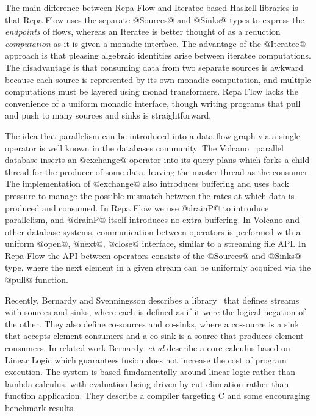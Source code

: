 The main difference between Repa Flow and Iteratee based Haskell libraries 
\cite{Kiselyov:iteratee, hackage:enumerator, hackage:conduit, hackage:pipes} is that Repa Flow uses the separate @Sources@ and @Sinks@ types to express the \emph{endpoints} of flows, whereas an Iteratee is better thought of as a reduction \emph{computation} as it is given a monadic interface. The advantage of the @Iteratee@ approach is that pleasing algebraic identities arise between iteratee computations. The disadvantage is that consuming data from two separate sources is awkward because each source is represented by its own monadic computation, and multiple computations must be layered using monad transformers. Repa Flow lacks the convenience of a uniform monadic interface, though writing programs that pull and push to many sources and sinks is straightforward.

The idea that parallelism can be introduced into a data flow graph via a single operator is well known in the databases community. The Volcano~\cite{Graefe:Volcano} parallel database inserts an @exchange@ operator into its query plans which forks a child thread for the producer of some data, leaving the master thread as the consumer. The implementation of @exchange@ also introduces buffering and uses back pressure to manage the possible mismatch between the rates at which data is produced and consumed. In Repa Flow we use @drainP@ to introduce parallelism, and @drainP@ itself introduces no extra buffering. In Volcano and other database systems, communication between operators is performed with a uniform @open@, @next@, @close@ interface, similar to a streaming file API. In Repa Flow the API between operators consists of the @Sources@ and @Sinks@ type, where the next element in a given stream can be uniformly acquired via the @pull@ function.

Recently, Bernardy and Svenningsson describes a library~\cite{Bernardy:Duality} that defines streams with sources and sinks, where each is defined as if it were the logical negation of the other. They also define co-sources and co-sinks, where a co-source is a sink that accepts element consumers and a co-sink is a source that produces element consumers. In related work Bernardy~\emph{et al} describe a core calculus \cite{Bernardy:Composable} based on Linear Logic which guarantees fusion does not increase the cost of program execution. The system is based fundamentally around linear logic rather than lambda calculus, with evaluation being driven by cut elimiation rather than function application. They describe a compiler targeting C and some encouraging benchmark results.


